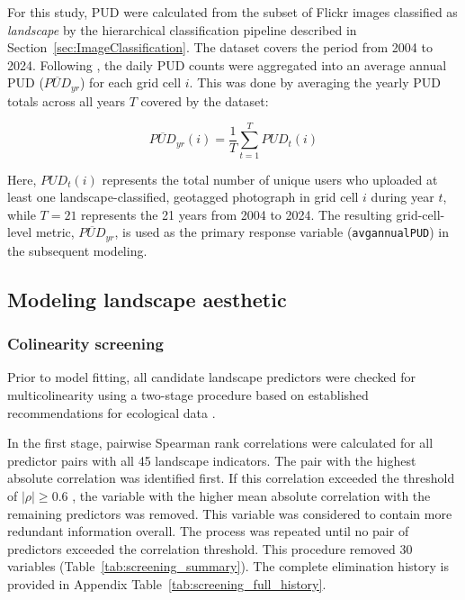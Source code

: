 \documentclass[11pt]{article}
\renewcommand{\_}{\textunderscore\allowbreak{}}
\begin{document}
For this study, PUD were calculated from the subset of Flickr images classified as \textit{landscape} by the hierarchical classification pipeline described in Section~\ref{sec:ImageClassification}. The dataset covers the period from 2004 to 2024. Following \citet{liao_mapping_2025}, the daily PUD counts were aggregated into an average annual PUD ($\overline{PUD}_{yr}$) for each grid cell $i$. This was done by averaging the yearly PUD totals across all years $T$ covered by the dataset:

\[
\overline{PUD}_{yr}(i) = \frac{1}{T}\sum_{t=1}^{T} PUD_t(i)
\]

Here, $PUD_t(i)$ represents the total number of unique users who uploaded at least one landscape-classified, geotagged photograph in grid cell $i$ during year $t$, while $T = 21$ represents the 21 years from 2004 to 2024. The resulting grid-cell-level metric, $\overline{PUD}_{yr}$, is used as the primary response variable (\texttt{avg\_annual\_PUD}) in the subsequent modeling.

\subsection{Modeling landscape aesthetic}\label{sec:model_fitting}
\subsubsection{Colinearity screening}\label{sec:collinearity}

Prior to model fitting, all candidate landscape predictors were checked for multicolinearity using a two-stage procedure based on established recommendations for ecological data \citep{zuur2010,dormann2012}. 

In the first stage, pairwise Spearman rank correlations were calculated for all predictor pairs with all 45 landscape indicators. The pair with the highest absolute correlation was identified first. If this correlation exceeded the threshold of $|\rho| \geq 0.6$ \citep{vaz_digital_2020}, the variable with the higher mean absolute correlation with the remaining predictors was removed. This variable was considered to contain more redundant information overall. The process was repeated until no pair of predictors exceeded the correlation threshold. This procedure removed 30 variables (Table~\ref{tab:screening_summary}). The complete elimination history is provided in Appendix Table~\ref{tab:screening_full_history}.
\end{document}
